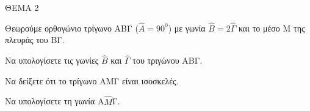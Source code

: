 
ΘΕΜΑ 2

Θεωρούμε ορθογώνιο τρίγωνο ΑΒΓ ($\widehat{Α} = 90^{0}$) με γωνία $\widehat{Β} = 2\widehat{\Gamma}$ και το μέσο Μ της πλευράς του ΒΓ.

\begin{alist}
\item Να υπολογίσετε τις γωνίες $\widehat{Β}$ και $\widehat{\Gamma}$ του τριγώνου ΑΒΓ. 

\item Να δείξετε ότι το τρίγωνο ΑΜΓ είναι ισοσκελές. 

\item Να υπολογίσετε τη γωνία Α$\widehat{Μ}$Γ. 
\end{alist}
